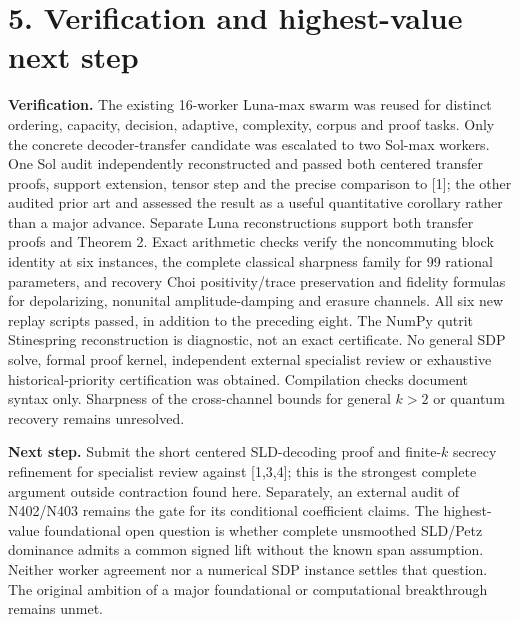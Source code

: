 \documentclass[10pt,a4paper]{article}
\begin{document}
\section*{5. Verification and highest-value next step}

\textbf{Verification.} The existing 16-worker Luna-max swarm was reused for distinct ordering, capacity, decision, adaptive, complexity, corpus and proof tasks. Only the concrete decoder-transfer candidate was escalated to two Sol-max workers. One Sol audit independently reconstructed and passed both centered transfer proofs, support extension, tensor step and the precise comparison to [1]; the other audited prior art and assessed the result as a useful quantitative corollary rather than a major advance. Separate Luna reconstructions support both transfer proofs and Theorem 2. Exact arithmetic checks verify the noncommuting block identity at six instances, the complete classical sharpness family for 99 rational parameters, and recovery Choi positivity/trace preservation and fidelity formulas for depolarizing, nonunital amplitude-damping and erasure channels. All six new replay scripts passed, in addition to the preceding eight. The NumPy qutrit Stinespring reconstruction is diagnostic, not an exact certificate. No general SDP solve, formal proof kernel, independent external specialist review or exhaustive historical-priority certification was obtained. Compilation checks document syntax only. Sharpness of the cross-channel bounds for general $k>2$ or quantum recovery remains unresolved.

\textbf{Next step.} Submit the short centered SLD-decoding proof and finite-$k$ secrecy refinement for specialist review against [1,3,4]; this is the strongest complete argument outside contraction found here. Separately, an external audit of N402/N403 remains the gate for its conditional coefficient claims. The highest-value foundational open question is whether complete unsmoothed SLD/Petz dominance admits a common signed lift without the known span assumption. Neither worker agreement nor a numerical SDP instance settles that question. The original ambition of a major foundational or computational breakthrough remains unmet.
\end{document}
